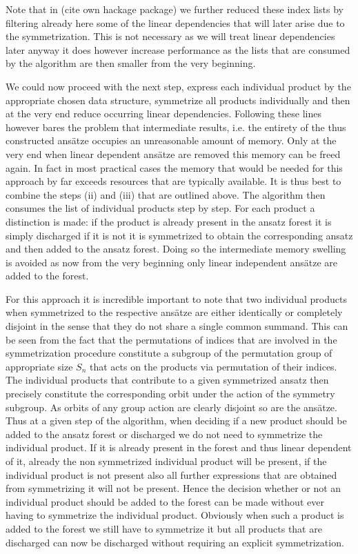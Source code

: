 \documentclass[a4paper,12pt, DIV=14, BCOR=5mm, twoside, headsepline]{scrbook}
\begin{document}
Note that in (cite own hackage package) we further reduced these index lists by filtering already here some of the linear dependencies that will later arise due to the symmetrization. This is not necessary as we will treat linear dependencies later anyway it does however increase performance as the lists that are consumed by the algorithm are then smaller from the very beginning.  

We could now proceed with the next step, express each individual product by the appropriate chosen data structure, symmetrize all products individually and then at the very end reduce occurring linear dependencies. Following these lines however bares the problem that intermediate results, i.e. the entirety of the thus constructed ansätze occupies an unreasonable amount of memory. Only at the very end when linear dependent ansätze are removed this memory can be freed again. In fact in most practical cases the memory that would be needed for this approach by far exceeds resources that are typically available.
It is thus best to combine the steps (ii) and (iii) that are outlined above. The algorithm then consumes the list of individual products step by step. For each product a distinction is made: if the product is already present in the ansatz forest it is simply discharged if it is not it is symmetrized to obtain the corresponding ansatz and then added to the ansatz forest. Doing so the intermediate memory swelling is avoided as now from the very beginning only linear independent ansätze are added to the forest.

For this approach it is incredible important to note that two individual products when symmetrized to the respective ansätze are either identically or completely disjoint in the sense that they do not share a single common summand. This can be seen from the fact that the permutations of indices that are involved in the symmetrization procedure constitute a subgroup of the permutation group of appropriate size $S_n$ that acts on the products via permutation of their indices. The individual products that contribute to a given symmetrized ansatz then precisely constitute the corresponding orbit under the action of the symmetry subgroup. As orbits of any group action are clearly disjoint so are the ansätze. Thus at a given step of the algorithm, when deciding if a new product should be added to the ansatz forest or discharged we do not need to symmetrize the individual product. If it is already present in the forest and thus linear dependent of it, already the non symmetrized individual product will be present, if the individual product is not present also all further expressions that are obtained from symmetrizing it will not be present. Hence the decision whether or not an individual product should be added to the forest can be made without ever having to symmetrize the individual product. Obviously when such a product is added to the forest we still have to symmetrize it but all products that are discharged can now be discharged without requiring an explicit symmetrization. 
\end{document}
